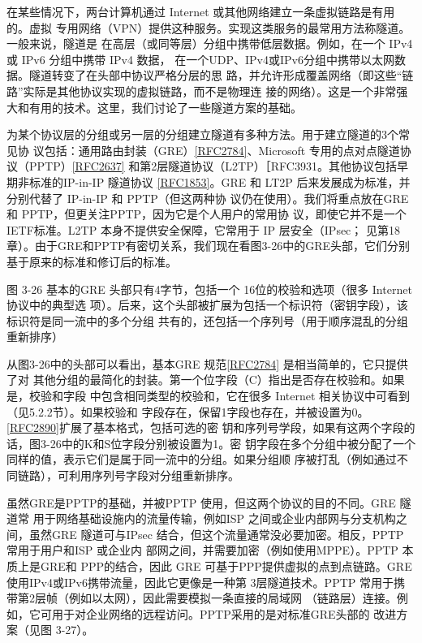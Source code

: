 在某些情况下，两台计算机通过 Internet 或其他网络建立一条虚拟链路是有用的。虚拟
专用网络（VPN）提供这种服务。实现这类服务的最常用方法称隧道。一般来说，隧道是
在高层（或同等层）分组中携带低层数据。例如，在一个 IPv4或 IPv6 分组中携带 IPv4 数据，
在一个UDP、IPv4或IPv6分组中携带以太网数据。隧道转变了在头部中协议严格分层的思
路，并允许形成覆盖网络（即这些“链路”实际是其他协议实现的虚拟链路，而不是物理连
接的网络）。这是一个非常强大和有用的技术。这里，我们讨论了一些隧道方案的基础。

为某个协议层的分组或另一层的分组建立隧道有多种方法。用于建立隧道的3个常见协
议包括：通用路由封装（GRE）\href{https://www.rfc-editor.org/rfc/rfc2784}{[RFC2784]}、Microsoft 专用的点对点隧道协议（PPTP）\href{https://www.rfc-editor.org/rfc/rfc2637}{[RFC2637]}
和第2层隧道协议（L2TP）［RFC3931。其他协议包括早期非标准的IP-in-IP 隧道协议
\href{https://www.rfc-editor.org/rfc/rfc1853}{[RFC1853]}。GRE 和 LT2P 后来发展成为标准，并分别代替了 IP-in-IP 和 PPTP（但这两种协
议仍在使用）。我们将重点放在GRE 和 PPTP，但更关注PPTP，因为它是个人用户的常用协
议，即使它并不是一个 IETF标准。L2TP 本身不提供安全保障，它常用于 IP 层安全（IPsec；
见第18章）。由于GRE和PPTP有密切关系，我们现在看图3-26中的GRE头部，它们分别
基于原来的标准和修订后的标准。


图 3-26
基本的GRE 头部只有4字节，包括一个 16位的校验和选项（很多 Internet 协议中的典型选
项）。后来，这个头部被扩展为包括一个标识符（密钥字段），该标识符是同一流中的多个分组
共有的，还包括一个序列号（用于顺序混乱的分组重新排序）

从图3-26中的头部可以看出，基本GRE 规范\href{https://www.rfc-editor.org/rfc/rfc2784}{[RFC2784]} 是相当简单的，它只提供了对
其他分组的最简化的封装。第一个位字段（C）指出是否存在校验和。如果是，校验和字段
中包含相同类型的校验和，它在很多 Internet 相关协议中可看到（见5.2.2节）。如果校验和
字段存在，保留1字段也存在，并被设置为0。\href{https://www.rfc-editor.org/rfc/rfc2890}{[RFC2890]}扩展了基本格式，包括可选的密
钥和序列号学段，如果有这两个字段的话，图3-26中的K和S位字段分别被设置为1。密
钥字段在多个分组中被分配了一个同样的值，表示它们是属于同一流中的分组。如果分组顺
序被打乱（例如通过不同链路），可利用序列号字段对分组重新排序。

虽然GRE是PPTP的基础，并被PPTP 使用，但这两个协议的目的不同。GRE 隧道常
用于网络基础设施内的流量传输，例如ISP 之间或企业内部网与分支机构之间，虽然GRE
隧道可与IPsec 结合，但这个流量通常没必要加密。相反，PPTP 常用于用户和ISP 或企业内
部网之间，并需要加密（例如使用MPPE）。PPTP 本质上是GRE和 PPP的结合，因此 GRE
可基于PPP提供虚拟的点到点链路。GRE使用IPv4或IPv6携带流量，因此它更像是一种第
3层隧道技术。PPTP 常用于携带第2层帧（例如以太网），因此需要模拟一条直接的局域网
（链路层）连接。例如，它可用于对企业网络的远程访问。PPTP采用的是对标准GRE头部的
改进方案（见图 3-27）。

